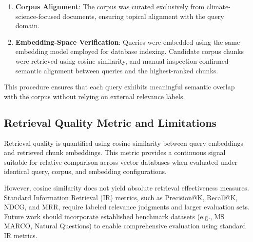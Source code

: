 \documentclass{article}
\begin{document}
\begin{enumerate}
\item \textbf{Corpus Alignment}: The corpus was curated exclusively from climate-science-focused documents, ensuring topical alignment with the query domain.
\item \textbf{Embedding-Space Verification}: Queries were embedded using the same embedding model employed for database indexing. Candidate corpus chunks were retrieved using cosine similarity, and manual inspection confirmed semantic alignment between queries and the highest-ranked chunks. 
\end{enumerate}

This procedure ensures that each query exhibits meaningful semantic overlap with the corpus without relying on external relevance labels.

\subsection{Retrieval Quality Metric and Limitations}

Retrieval quality is quantified using cosine similarity between query embeddings and retrieved chunk embeddings. This metric provides a continuous signal suitable for relative comparison across vector databases when evaluated under identical query, corpus, and embedding configurations.

However, cosine similarity does not yield absolute retrieval effectiveness measures. Standard Information Retrieval (IR) metrics, such as Precision@K, Recall@K, NDCG, and MRR, require labeled relevance judgments and larger evaluation sets. Future work should incorporate established benchmark datasets (e.g., MS MARCO, Natural Questions) to enable comprehensive evaluation using standard IR metrics.


\end{document}

